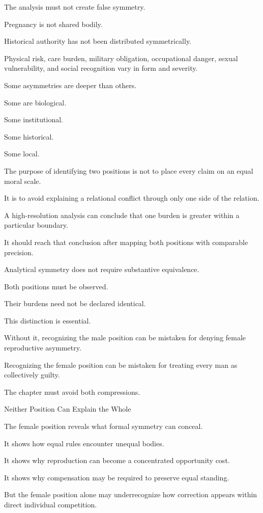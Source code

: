 The analysis must not create false symmetry.

Pregnancy is not shared bodily.

Historical authority has not been distributed symmetrically.

Physical risk, care burden, military obligation, occupational danger, sexual vulnerability, and social recognition vary in form and severity.

Some asymmetries are deeper than others.

Some are biological.

Some institutional.

Some historical.

Some local.

The purpose of identifying two positions is not to place every claim on an equal moral scale.

It is to avoid explaining a relational conflict through only one side of the relation.

A high-resolution analysis can conclude that one burden is greater within a particular boundary.

It should reach that conclusion after mapping both positions with comparable precision.

Analytical symmetry does not require substantive equivalence.

Both positions must be observed.

Their burdens need not be declared identical.

This distinction is essential.

Without it, recognizing the male position can be mistaken for denying female reproductive asymmetry.

Recognizing the female position can be mistaken for treating every man as collectively guilty.

The chapter must avoid both compressions.

Neither Position Can Explain the Whole

The female position reveals what formal symmetry can conceal.

It shows how equal rules encounter unequal bodies.

It shows why reproduction can become a concentrated opportunity cost.

It shows why compensation may be required to preserve equal standing.

But the female position alone may underrecognize how correction appears within direct individual competition.

